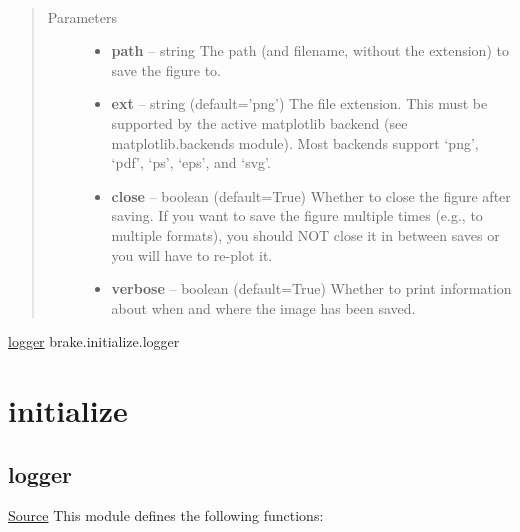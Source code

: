 \documentclass[letterpaper,10pt,english]{sphinxmanual}
\begin{document}
\begin{fulllineitems}
\label{index:brake.__init__.save}~\begin{quote}\begin{description}
\item[{Parameters}] \leavevmode\begin{itemize}
\item {} 
\textbf{path} -- string
The path (and filename, without the extension) to save the
figure to.

\item {} 
\textbf{ext} -- string (default='png')
The file extension. This must be supported by the active
matplotlib backend (see matplotlib.backends module).  Most
backends support `png', `pdf', `ps', `eps', and `svg'.

\item {} 
\textbf{close} -- boolean (default=True)
Whether to close the figure after saving.  If you want to save
the figure multiple times (e.g., to multiple formats), you
should NOT close it in between saves or you will have to
re-plot it.

\item {} 
\textbf{verbose} -- boolean (default=True)
Whether to print information about when and where the image
has been saved.

\end{itemize}

\end{description}\end{quote}

\end{fulllineitems}





{\hyperref[index:logger]{logger}}  brake.initialize.logger




\chapter{initialize}
\label{index:initialize}

\section{logger}
\label{index:logger}
\href{https://bitbucket.org/akadar/brakesqueal0.1/src/master/brake/initialize/logger.py?at=master}{Source}
\label{index:module-brake.initialize.logger}
This module defines the following functions:
\end{document}
